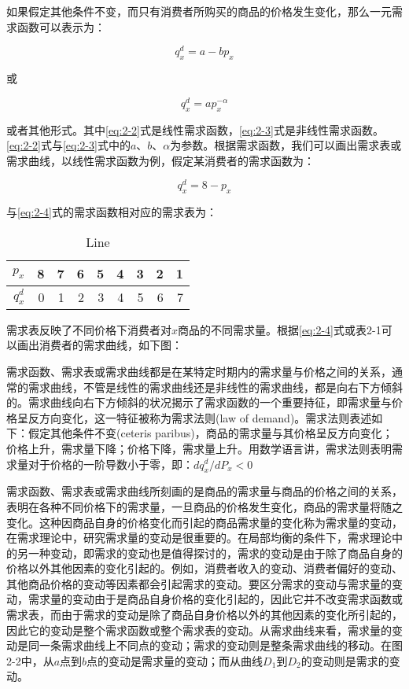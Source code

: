 如果假定其他条件不变，而只有消费者所购买的商品的价格发生变化，那么一元需求函数可以表示为：

\begin{equation}\label{eq:2-2}
	q_x^d=a-bp_x
\end{equation}

或

\begin{equation}\label{eq:2-3}
	q_x^d=ap_x^{-\alpha}
\end{equation}

或者其他形式。其中\eqref{eq:2-2}式是线性需求函数，\eqref{eq:2-3}式是非线性需求函数。\eqref{eq:2-2}式与\eqref{eq:2-3}式中的$a$、$b$、$\alpha$为参数。根据需求函数，我们可以画出需求表或需求曲线，以线性需求函数为例，假定某消费者的需求函数为：


\begin{equation}\label{eq:2-4}
	q_x^d=8-p_x
\end{equation}

与\eqref{eq:2-4}式的需求函数相对应的需求表为：

\begin{table}
	\caption{Line}
	\centering
	\begin{tabular}{|r|r|r|r|r|r|r|r|r|}
		\hline
		$p_x$ 	& 8 & 7 & 6 & 5 & 4 & 3 & 2 & 1 \\
		\hline
		$q_x^d$ & 0 & 1 & 2 & 3 & 4 & 5 & 6 & 7 \\
		\hline
	\end{tabular}
\end{table}

需求表反映了不同价格下消费者对$x$商品的不同需求量。根据\eqref{eq:2-4}式或表2-1可以画出消费者的需求曲线，如下图：

需求函数、需求表或需求曲线都是在某特定时期内的需求量与价格之间的关系，通常的需求曲线，不管是线性的需求曲线还是非线性的需求曲线，都是向右下方倾斜的。需求曲线向右下方倾斜的状况揭示了需求函数的一个重要持征，即需求量与价格呈反方向变化，这一特征被称为{\hei 需求法则}(law of demand)。需求法则表述如下：假定其他条件不变(ceteris paribus)，商品的需求量与其价格呈反方向变化；价格上升，需求量下降；价格下降，需求量上升。用数学语言讲，需求法则表明需求量对于价格的一阶导数小于零，即：$dq_x^d/dP_x<0$

需求函数、需求表或需求曲线所刻画的是商品的需求量与商品的价格之间的关系，表明在各种不同价格下的需求量，一旦商品的价格发生变化，商品的需求量将随之变化。这种因商品自身的价格变化而引起的商品需求量的变化称为需求量的变动，在需求理论中，研究需求量的变动是很重要的。在局部均衡的条件下，需求理论中的另一种变动，即需求的变动也是值得探讨的，需求的变动是由于除了商品自身的价格以外其他因素的变化引起的。例如，消费者收入的变动、消费者偏好的变动、其他商品价格的变动等因素都会引起需求的变动。要区分需求的变动与需求量的变动，需求量的变动由于是商品自身价格的变化引起的，因此它并不改变需求函数或需求表，而由于需求的变动是除了商品自身价格以外的其他因素的变化所引起的，因此它的变动是整个需求函数或整个需求表的变动。从需求曲线来看，需求量的变动是同一条需求曲线上不同点的变动；需求的变动则是整条需求曲线的移动。在图2-2中，从$a$点到$b$点的变动是需求量的变动；而从曲线$D_1$到$D_2$的变动则是需求的变动。

